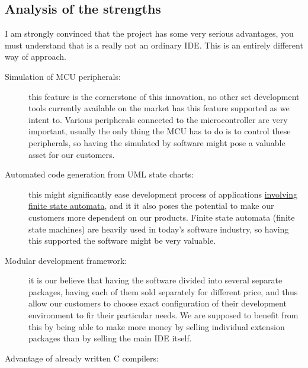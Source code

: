 \documentclass[a4paper,twoside,15pt]{book}
\begin{document}
		\subsection{Analysis of the strengths}
			I am strongly convinced that the project has some very serious advantages, you must understand that is a really not an ordinary IDE. This is an entirely different way of approach.
			 \begin{description}
				\item[Simulation of MCU peripherals:]
					this feature is the cornerstone of this innovation, no other set development tools currently available on the market has this feature supported as we intent to. Various peripherals connected to the microcontroller are very important, usually the only thing the MCU has to do is to control these peripherals, so having the simulated by software might pose a valuable asset for our customers.
				\item[Automated code generation from UML state charts:]
					this might significantly ease development process of applications \href{http://en.wikipedia.org/wiki/Finite-state_machine}{involving finite state automata}, and it it also poses the potential to make our customers more dependent on our products. Finite state automata (finite state machines) are heavily used in today's software industry, so having this supported the software might be very valuable.
				\item[Modular development framework:]
					it is our believe that having the software divided into several separate packages, having each of them sold separately for different price, and thus allow our customers to choose exact configuration of their development environment to fir their particular needs. We are supposed to benefit from this by being able to make more money by selling individual extension packages than by selling the main IDE itself.
				\item[Advantage of already written C compilers:]

\end{description}
\end{document}
